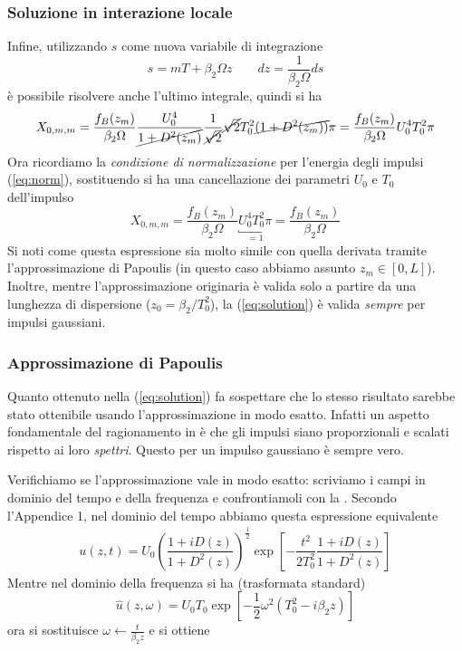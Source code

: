 \documentclass[8pt]{beamer} %
\begin{document}
\begin{frame}
    \frametitle {Soluzione in interazione locale}
    Infine, utilizzando $s$ come nuova variabile di integrazione
    \begin{equation}
        s = mT+\beta_2\Omega z  \qquad dz = \dfrac{1}{\beta_2\Omega}ds
    \end{equation}
    è possibile risolvere anche l'ultimo integrale, quindi si ha
    \begin{equation}
        X_{0, m, m} = \dfrac{f_B(z_m)}{\beta_2 \Omega} \dfrac{U_0^4}{\cancel{1+D^2(z_m)}} \dfrac{1}{\cancel{\sqrt{2}}} \cancel{\sqrt{2}} T_0^2 \cancel{(1+D^2(z_m))} \pi = \dfrac{f_B(z_m)}{\beta_2 \Omega} U_0^4 T_0^2 \pi
    \end{equation}
    Ora ricordiamo la \textit{condizione di normalizzazione} per l'energia degli impulsi (\ref{eq:norm}), sostituendo si ha una cancellazione dei parametri $U_0$ e $T_0$ dell'impulso
    \begin{equation}\label{eq:solution}
        X_{0, m, m} = \dfrac{f_B(z_m)}{\beta_2 \Omega} \underbracket{U_0^4 T_0^2 \pi}_{=1} = \dfrac{f_B(z_m)}{\beta_2 \Omega}
    \end{equation}
    Si noti come questa espressione sia molto simile con quella derivata tramite l'approssimazione di Papoulis \cite[eq. 10]{Dar_2013} (in questo caso abbiamo assunto $z_m \in [0, L]$).
    Inoltre, mentre l'approssimazione originaria è valida solo a partire da una lunghezza di dispersione ($z_0 = \beta_2/T_0^2$), la (\ref{eq:solution}) è valida \textit{sempre} per impulsi gaussiani.
\end{frame}


\begin{frame}
    \frametitle{Approssimazione di Papoulis}
    Quanto ottenuto nella (\ref{eq:solution}) fa sospettare che lo stesso risultato sarebbe stato ottenibile usando l'approssimazione in modo esatto. Infatti un aspetto fondamentale del ragionamento in \cite{Dar_2013} è che gli impulsi siano proporzionali e scalati rispetto ai loro \textit{spettri}. Questo per un impulso gaussiano è sempre vero.

    \vspace{20pt}
    Verifichiamo se l'approssimazione vale in modo esatto: scriviamo i campi in dominio del tempo e della frequenza e confrontiamoli con la \cite[eq. 10]{Dar_2013}. Secondo l'Appendice 1, nel dominio del tempo abbiamo questa espressione equivalente
    \begin{align}
        u(z, t) = U_0 \left(\dfrac{1+iD(z)}{1+D^2(z)}\right)^{\frac{1}{2}} \exp\left[-\dfrac{t^2}{2T_0^2} \dfrac{1+iD(z)}{1+D^2(z)}\right]
    \end{align}
    Mentre nel dominio della frequenza si ha (trasformata standard)
    \begin{equation}
        \hat{u}(z, \omega) = U_0 T_0 \exp\left[-\dfrac{1}{2} \omega^2 (T_0^2 - i\beta_2z)\right]
    \end{equation}
    ora si sostituisce $\omega \leftarrow \frac{t}{\beta_2z}$ e si ottiene
\end{frame}
\end{document}
